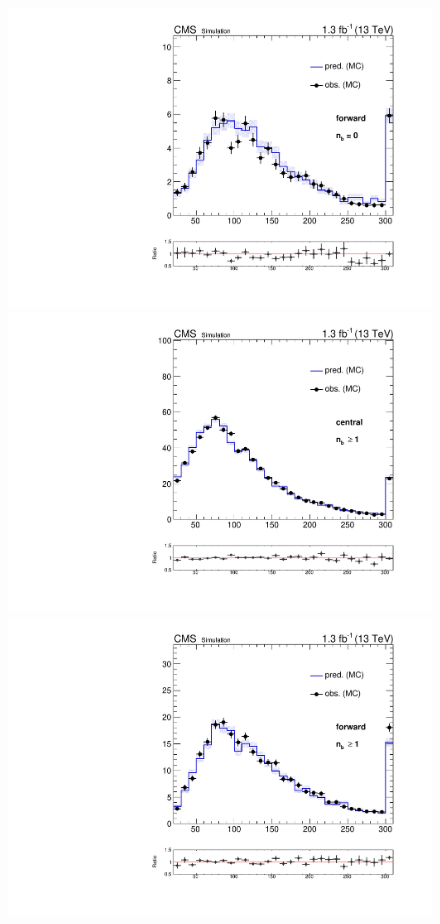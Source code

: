 \begin{figure}[htb]
\begin{center}
    \includegraphics[scale=0.25]{bkgd/figs/plot_results_mll_MCClosure_forward_onlyTT_nb0.pdf} \\
    \includegraphics[scale=0.25]{bkgd/figs/plot_results_mll_MCClosure_central_onlyTT_nb1.pdf}
    \includegraphics[scale=0.25]{bkgd/figs/plot_results_mll_MCClosure_forward_onlyTT_nb1.pdf}\\

\end{center}
\end{figure}
